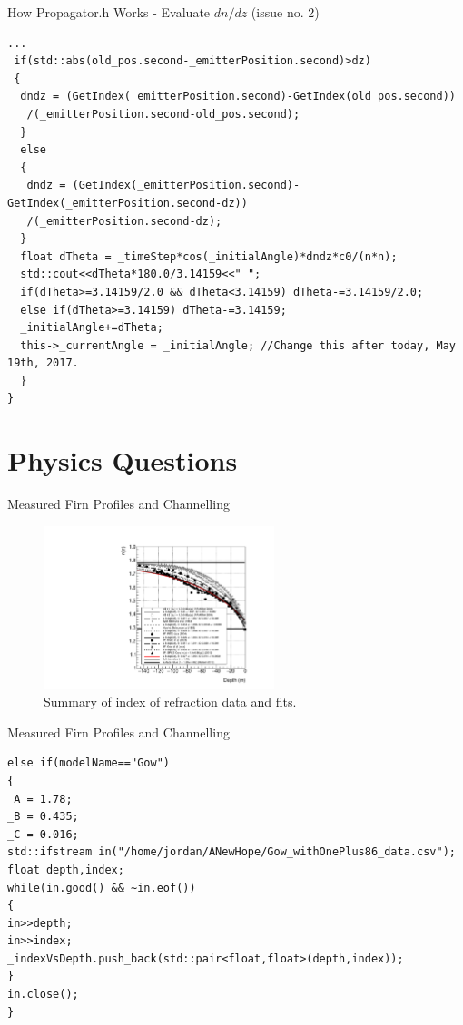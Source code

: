 \documentclass{beamer}
\begin{document}
\begin{frame}[fragile]{How Propagator.h Works - Evaluate $dn/dz$ (issue no. 2)}
\tiny
\begin{verbatim}
...
 if(std::abs(old_pos.second-_emitterPosition.second)>dz)
 {
  dndz = (GetIndex(_emitterPosition.second)-GetIndex(old_pos.second))
   /(_emitterPosition.second-old_pos.second);
  }
  else
  {
   dndz = (GetIndex(_emitterPosition.second)-GetIndex(_emitterPosition.second-dz))
   /(_emitterPosition.second-dz);
  }
  float dTheta = _timeStep*cos(_initialAngle)*dndz*c0/(n*n);
  std::cout<<dTheta*180.0/3.14159<<" ";
  if(dTheta>=3.14159/2.0 && dTheta<3.14159) dTheta-=3.14159/2.0;
  else if(dTheta>=3.14159) dTheta-=3.14159;
  _initialAngle+=dTheta;
  this->_currentAngle = _initialAngle; //Change this after today, May 19th, 2017.
  }
}
\end{verbatim}
\end{frame}

\section{Physics Questions}

\begin{frame}{Measured Firn Profiles and Channelling}
\begin{figure}
\begin{center}
\includegraphics[width=0.6\textwidth,angle=270]{figures/April21_plot1.pdf}
\caption{\label{fig:fig3} Summary of index of refraction data and fits.}
\end{center}
\end{figure}
\end{frame}

\begin{frame}[fragile]{Measured Firn Profiles and Channelling}
\begin{verbatim}
else if(modelName=="Gow")
{
_A = 1.78;
_B = 0.435;
_C = 0.016;
std::ifstream in("/home/jordan/ANewHope/Gow_withOnePlus86_data.csv");
float depth,index;
while(in.good() && ~in.eof())
{
in>>depth;
in>>index;
_indexVsDepth.push_back(std::pair<float,float>(depth,index));
}
in.close();
}
\end{verbatim}
\end{frame}
\end{document}
